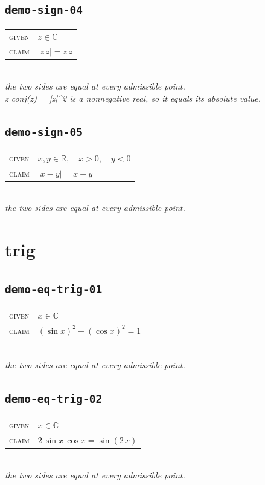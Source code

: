 \documentclass[11pt]{article}
\begin{document}
\subsection*{\texttt{demo-sign-04}}
\begin{tabular}{@{}l@{\quad}l@{}}
\textsc{given} & $z \in \mathbb{C}$ \\[4pt]
\textsc{claim} & $\displaystyle \left|z \, \overline{z}\right| = z \, \overline{z}$ \\
\end{tabular}\\[2pt]
{\small\emph{the two sides are equal at every admissible point.}}\\
\emph{z conj(z) = |z|\textasciicircum{}2 is a nonnegative real, so it equals its absolute value.}\\

\subsection*{\texttt{demo-sign-05}}
\begin{tabular}{@{}l@{\quad}l@{}}
\textsc{given} & $x, y \in \mathbb{R},\quad x > 0,\quad y < 0$ \\[4pt]
\textsc{claim} & $\displaystyle \left|x - y\right| = x - y$ \\
\end{tabular}\\[2pt]
{\small\emph{the two sides are equal at every admissible point.}}\\

\section*{trig}
\subsection*{\texttt{demo-eq-trig-01}}
\begin{tabular}{@{}l@{\quad}l@{}}
\textsc{given} & $x \in \mathbb{C}$ \\[4pt]
\textsc{claim} & $\displaystyle \left(\sin x\right)^{2} + \left(\cos x\right)^{2} = 1$ \\
\end{tabular}\\[2pt]
{\small\emph{the two sides are equal at every admissible point.}}\\

\subsection*{\texttt{demo-eq-trig-02}}
\begin{tabular}{@{}l@{\quad}l@{}}
\textsc{given} & $x \in \mathbb{C}$ \\[4pt]
\textsc{claim} & $\displaystyle 2 \, \sin x \, \cos x = \sin\left(2 \, x\right)$ \\
\end{tabular}\\[2pt]
{\small\emph{the two sides are equal at every admissible point.}}\\
\end{document}
